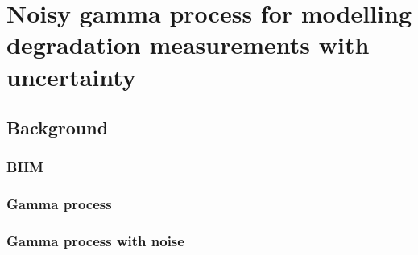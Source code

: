 \chapter{Noisy gamma process for modelling degradation measurements with uncertainty}\label{chap:chapter5}

\section{Background}

\subsection{BHM}

\subsection{Gamma process}

\subsection{Gamma process with noise}